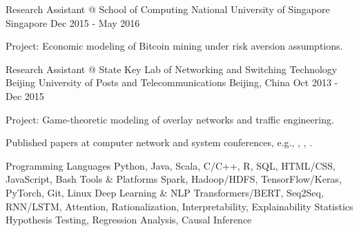\documentclass[letterpaper]{awesome-cv}
\begin{document}
\begin{cventries}
  \cventry
    {Research Assistant @ School of Computing}
    {National University of Singapore}
    {Singapore}
    {Dec 2015 - May 2016}
    {
      \begin{cvitems}
        \item {Project: Economic modeling of Bitcoin mining under risk aversion assumptions.}
      \end{cvitems}
    }
  \cventry
    {Research Assistant @ State Key Lab of Networking and Switching Technology}
    {Beijing University of Posts and Telecommunications}
    {Beijing, China}
    {Oct 2013 - Dec 2015}
    {
      \begin{cvitems}
        \item {Project: Game-theoretic modeling of overlay networks and traffic engineering.}
        \item {Published papers at computer network and system conferences, e.g., , , .}
      \end{cvitems}
    }
\end{cventries}

\addvspace{1ex}
\begin{cventries}
 \cvskillnew
    {Programming Languages}
    {Python, Java, Scala, C/C++, R, SQL, HTML/CSS, JavaScript, Bash}
  \cvskillnew
    {Tools \& Platforms}
    {Spark, Hadoop/HDFS, TensorFlow/Keras, PyTorch, Git, Linux}
  \cvskillnew
    {Deep Learning \& NLP}
    {Transformers/BERT, Seq2Seq, RNN/LSTM, Attention, Rationalization, Interpretability, Explainability}
  \cvskillnew
    {Statistics}
    {Hypothesis Testing, Regression Analysis, Causal Inference}
\end{cventries}
\end{document}
